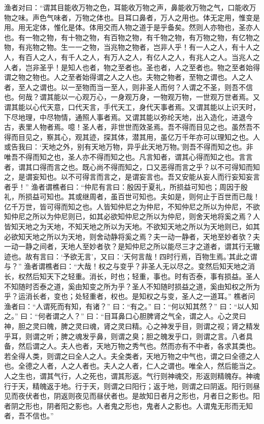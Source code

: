 \documentclass[12pt,UTF8]{ctexbook}
\begin{document}
渔者对曰：“谓其目能收万物之色，耳能收万物之声，鼻能收万物之气，口能收万物之味。声色气味者，万物之体也。目耳口鼻者，万人之用也。体无定用，惟变是用。用无定体，惟化是体。体用交而人物之道于是乎备矣。然则人亦物也，圣亦人也。有一物之物，有十物之物，有百物之物，有千物之物，有万物之物，有亿物之物，有兆物之物。生一一之物，当兆物之物者，岂非人乎！有一人之人，有十人之人，有百人之人，有千人之人，有万人之人，有亿人之人，有兆人之人。当兆人之人者，岂非圣乎！是知人也者，物之至者也。圣也者，人之至者也。物之至者始得谓之物之物也。人之至者始得谓之人之人也。夫物之物者，至物之谓也。人之人者，至人之谓也。以一至物而当一至人，则非圣人而何？人谓之不圣，则吾不信也。何哉？谓其能以一心观万心，一身观万身，一物观万物，一世观万世者焉。又谓其能以心代天意，口代天言，手代天工，身代天事者焉。又谓其能以上识天时，下尽地理，中尽物情，通照人事者焉。又谓其能以弥纶天地，出入造化，进退今古，表里人物者焉。噫！圣人者，非世世而效圣焉。吾不得而目见之也。虽然吾不得而目见之，察其心，观其迹，探其体，潜其用，虽亿万千年亦可以理知之也。人或告我曰：‘天地之外，别有天地万物，异乎此天地万物。’则吾不得而知之也。非唯吾不得而知之也，圣人亦不得而知之也。凡言知者，谓其心得而知之也。言言者，谓其口得而言之也。既心尚不得而知之，口又恶得而言之乎？以不可得知而知之，是谓妄知也。以不可得言而言之，是谓妄言也。吾又安能从妄人而行妄知妄言者乎！”
渔者谓樵者曰：“仲尼有言曰：殷因于夏礼，所损益可知也；周因于殷礼，所损益可知也。其或继周者，虽百世可知也。夫如是，则何止于百世而已哉！亿千万世，皆可得而知之也。人皆知仲尼之为仲尼，不知仲尼之所以为仲尼，不欲知仲尼之所以为仲尼则已，如其必欲知仲尼之所以为仲尼，则舍天地将奚之焉？人皆知天地之为天地，不知天地之所以为天地。不欲知天地之所以为天地则已，如其必欲知天地之所以为天地，则舍动静将奚之焉？夫一动一静者，天地至妙者欤？夫一动一静之间者，天地人至妙者欤？是知仲尼之所以能尽三才之道者，谓其行无辙迹也。故有言曰：‘予欲无言’，又曰：‘天何言哉！四时行焉，百物生焉。’其此之谓与？”
渔者谓樵者曰：“大哉！权之与变乎？非圣人无以尽之。变然后知天地之消长，权然后知天下之轻重。消长，时也；轻重，事也。时有否泰，事有损益。圣人不知随时否泰之道，奚由知变之所为乎？圣人不知随时损益之道，奚由知权之所为乎？运消长者，变也；处轻重者，权也。是知权之与变，圣人之一道耳。”
樵者问渔者曰：“人谓死而有知，有诸？”
曰：“有之。”
曰：“何以知其然？”
曰：“以人知之。”
曰：“何者谓之人？”
曰：“目耳鼻口心胆脾肾之气全，谓之人。心之灵曰神，胆之灵曰魄，脾之灵曰魂，肾之灵曰精。心之神发乎目，则谓之视；肾之精发乎耳，则谓之听；脾之魂发乎鼻，则谓之臭；胆之魄发乎口，则谓之言。八者具备，然后谓之人。夫人也者，天地万物之秀气也。然而亦有不中者，各求其类也。若全得人类，则谓之曰全人之人。夫全类者，天地万物之中气也，谓之曰全德之人也。全德之人者，人之人者也。夫人之人者，仁人之谓也。唯全人，然后能当之。人之生也，谓其气行，人之死也，谓其形返。气行则神魂交，形返则精魄存。神魂行于天，精魄返于地。行于天，则谓之曰阳行；返于地，则谓之曰阴返。阳行则昼见而夜伏者也，阴返则夜见而昼伏者也。是故知日者月之形也，月者日之影也。阳者阴之形也，阴者阳之影也。人者鬼之形也，鬼者人之影也。人谓鬼无形而无知者，吾不信也。”
\end{document}
